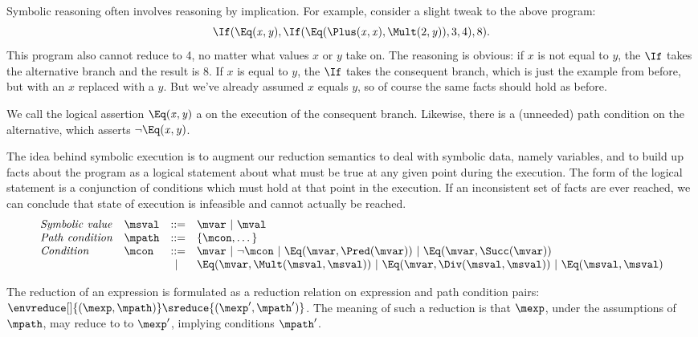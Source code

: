 Symbolic reasoning often involves reasoning by implication.  For
example, consider a slight tweak to the above program:
\[
\If(\Eq(\mathit{x},\mathit{y}),
 \If(\Eq(\Plus(\mathit{x},\mathit{x}), \Mult(2,\mathit{y})), 3, 4),
  8)\text.
\]
This program also cannot reduce to 4, no matter what values
\(\mathit{x}\) or \(\mathit{y}\) take on.  The reasoning is obvious:
if \(\mathit{x}\) is not equal to \(\mathit{y}\), the \(\If\) takes the
alternative branch and the result is 8.  If \(\mathit{x}\) is equal to
\(\mathit{y}\), the \(\If\) takes the consequent branch, which is just the
example from before, but with an \(\mathit{x}\) replaced with a
\(\mathit{y}\).  But we've already assumed \(\mathit{x}\) equals
\(\mathit{y}\), so of course the same facts should hold as before.

We call the logical assertion \(\Eq(\mathit{x}, \mathit{y})\) a
 on the execution of the consequent branch.
Likewise, there is a (unneeded) path condition on the alternative,
which asserts \(\neg\Eq(\mathit{x},\mathit{y})\).

The idea behind symbolic execution is to augment our reduction
semantics to deal with symbolic data, namely variables, and to build
up facts about the program as a logical statement about what must be
true at any given point during the execution.  The form of the logical
statement is a conjunction of conditions which must hold at that point
in the execution.  If an inconsistent set of facts are ever reached,
we can conclude that state of execution is infeasible and cannot
actually be reached.
\[
\begin{array}{llcl}
\mathit{Symbolic\ value}  & \msval & ::= & \mvar\ |\ \mval\\
\mathit{Path\ condition}  & \mpath & ::= & \{ \mcon, \dots \}\\
\mathit{Condition}        & \mcon  & ::= & \mvar\ |\ \neg\mcon\ |\ \Eq(\mvar,\Pred(\mvar))\ |\ \Eq(\mvar,\Succ(\mvar))\\
                          &        & |\  & \Eq(\mvar,\Mult(\msval,\msval))\ |\ \Eq(\mvar,\Div(\msval,\msval))\ |\ \Eq(\msval,\msval)
\end{array}
\]

The reduction of an expression is formulated as a reduction relation
on expression and path condition pairs:
$\envreduce[\relax]{(\mexp,\mpath)}\sreduce{(\mexp',\mpath')}$.  The
meaning of such a reduction is that $\mexp$, under the assumptions of
$\mpath$, may reduce to to $\mexp'$, implying conditions $\mpath'$.

